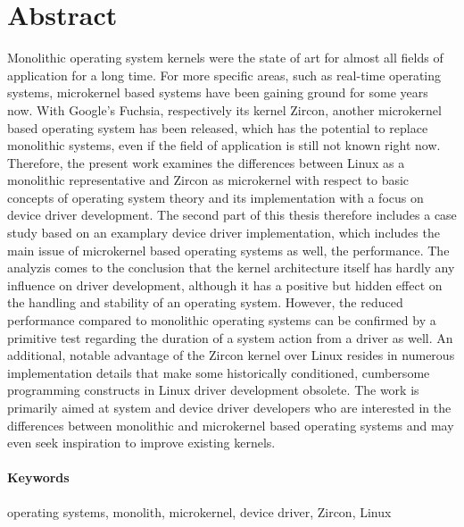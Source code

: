 \section*{Abstract}
Monolithic operating system kernels were the state of art for almost all fields of application for a long time.
For more specific areas, such as real-time operating systems, microkernel based systems have been gaining ground for some years now.
With Google's Fuchsia, respectively its kernel Zircon, another microkernel based operating system has been released, which has the potential to replace monolithic systems, even if the field of application is still not known right now.
Therefore, the present work examines the differences between Linux as a monolithic representative and Zircon as microkernel with respect to basic concepts of operating system theory and its implementation with a focus on device driver development.
The second part of this thesis therefore includes a case study based on an examplary device driver implementation, which includes the main issue of microkernel based operating systems as well, the performance.
The analyzis comes to the conclusion that the kernel architecture itself has hardly any influence on driver development, although it has a positive but hidden effect on the handling and stability of an operating system.
However, the reduced performance compared to monolithic operating systems can be confirmed by a primitive test regarding the duration of a system action from a driver as well.
An additional, notable advantage of the Zircon kernel over Linux resides in numerous implementation details that make some historically conditioned, cumbersome programming constructs in Linux driver development obsolete.
The work is primarily aimed at system and device driver developers who are interested in the differences between monolithic and microkernel based operating systems and may even seek inspiration to improve existing kernels.

\paragraph{Keywords} operating systems, monolith, microkernel, device driver, Zircon, Linux


